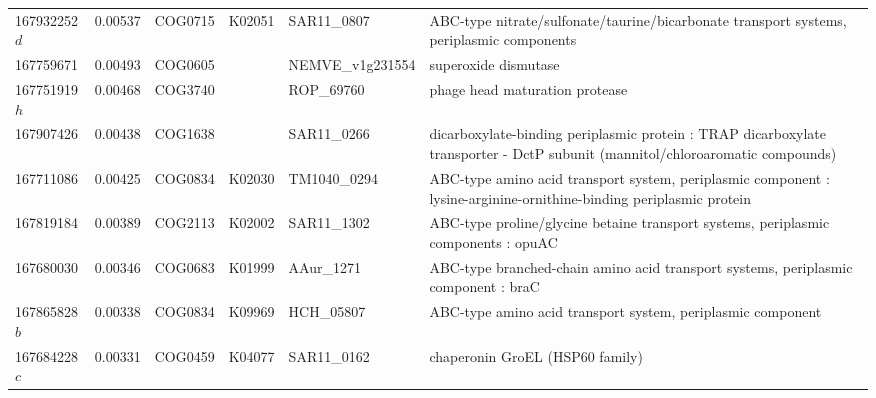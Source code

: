 \begin{landscape}
\begin{longtable}{p{1.6cm}p{1.2cm}p{1.5cm}p{1.5cm}p{2.8cm}p{13.5cm}}
167932252$d$ & 0.00537 & COG0715 & K02051 & SAR11\_0807 & ABC-type nitrate/sulfonate/taurine/bicarbonate transport systems, periplasmic components \\
167759671 & 0.00493 & COG0605 &  & NEMVE\_v1g231554 & superoxide dismutase \\
167751919$h$ & 0.00468 & COG3740 &  & ROP\_69760 & phage head maturation protease \\
167907426 & 0.00438 & COG1638 &  & SAR11\_0266 & dicarboxylate-binding periplasmic protein : TRAP dicarboxylate transporter - DctP subunit (mannitol/chloroaromatic compounds) \\
167711086 & 0.00425 & COG0834 & K02030 & TM1040\_0294 & ABC-type amino acid transport system, periplasmic component : lysine-arginine-ornithine-binding periplasmic protein \\
167819184 & 0.00389 & COG2113 & K02002 & SAR11\_1302 & ABC-type proline/glycine betaine transport systems, periplasmic components : opuAC \\
167680030 & 0.00346 & COG0683 & K01999 & AAur\_1271 & ABC-type branched-chain amino acid transport systems, periplasmic component : braC \\
167865828$b$ & 0.00338 & COG0834 & K09969 & HCH\_05807 & ABC-type amino acid transport system, periplasmic component \\
167684228$c$ & 0.00331 & COG0459 & K04077 & SAR11\_0162 & chaperonin GroEL (HSP60 family) \\
\end{longtable}
\endgroup
\end{landscape}
